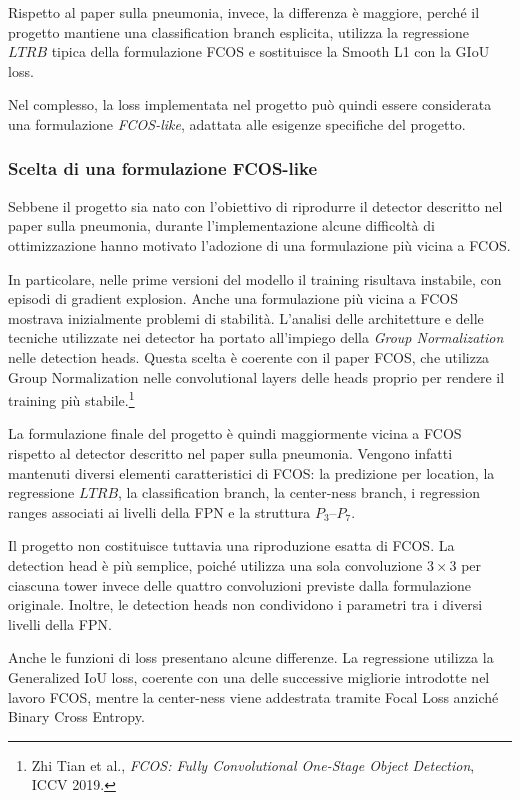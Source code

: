 Rispetto al paper sulla pneumonia, invece, la differenza è maggiore, perché il
progetto mantiene una classification branch esplicita, utilizza la
regressione $LTRB$ tipica della formulazione FCOS e sostituisce la Smooth L1
con la GIoU loss.

Nel complesso, la loss implementata nel progetto può quindi essere considerata
una formulazione \textit{FCOS-like}, adattata alle esigenze specifiche del
progetto.


\subsubsection{Scelta di una formulazione FCOS-like}

Sebbene il progetto sia nato con l'obiettivo di riprodurre il detector descritto
nel paper sulla pneumonia, durante l'implementazione alcune difficoltà di
ottimizzazione hanno motivato l'adozione di una formulazione più vicina a FCOS.

In particolare, nelle prime versioni del modello il training risultava
instabile, con episodi di gradient explosion. Anche una formulazione più vicina
a FCOS mostrava inizialmente problemi di stabilità. L'analisi delle
architetture e delle tecniche utilizzate nei detector ha portato all'impiego
della \textit{Group Normalization} nelle detection heads. Questa scelta è
coerente con il paper FCOS, che utilizza Group Normalization nelle convolutional
layers delle heads proprio per rendere il training più stabile.\footnote{Zhi
Tian et al., \textit{FCOS: Fully Convolutional One-Stage Object Detection},
ICCV 2019.}

La formulazione finale del progetto è quindi maggiormente vicina a FCOS rispetto
al detector descritto nel paper sulla pneumonia. Vengono infatti mantenuti
diversi elementi caratteristici di FCOS: la predizione per location, la
regressione $LTRB$, la classification branch, la center-ness branch, i
regression ranges associati ai livelli della FPN e la struttura $P_3$--$P_7$.

Il progetto non costituisce tuttavia una riproduzione esatta di FCOS. La
detection head è più semplice, poiché utilizza una sola convoluzione $3\times3$
per ciascuna tower invece delle quattro convoluzioni previste dalla
formulazione originale. Inoltre, le detection heads non condividono i parametri
tra i diversi livelli della FPN.

Anche le funzioni di loss presentano alcune differenze. La regressione utilizza
la Generalized IoU loss, coerente con una delle successive migliorie introdotte
nel lavoro FCOS, mentre la center-ness viene addestrata tramite Focal Loss
anziché Binary Cross Entropy.

